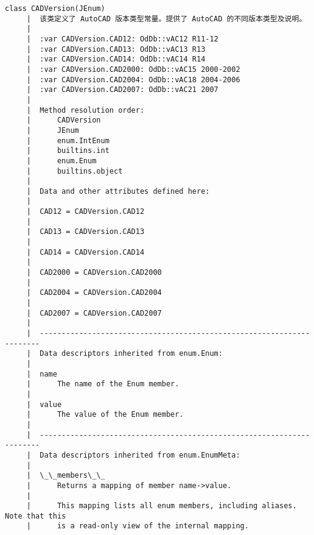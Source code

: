 \documentclass[11pt]{article}
\begin{document}
\begin{Verbatim}[commandchars=\\\{\}]
    class CADVersion(JEnum)
     |  该类定义了 AutoCAD 版本类型常量。提供了 AutoCAD 的不同版本类型及说明。
     |  
     |  :var CADVersion.CAD12: OdDb::vAC12 R11-12
     |  :var CADVersion.CAD13: OdDb::vAC13 R13
     |  :var CADVersion.CAD14: OdDb::vAC14 R14
     |  :var CADVersion.CAD2000: OdDb::vAC15 2000-2002
     |  :var CADVersion.CAD2004: OdDb::vAC18 2004-2006
     |  :var CADVersion.CAD2007: OdDb::vAC21 2007
     |  
     |  Method resolution order:
     |      CADVersion
     |      JEnum
     |      enum.IntEnum
     |      builtins.int
     |      enum.Enum
     |      builtins.object
     |  
     |  Data and other attributes defined here:
     |  
     |  CAD12 = CADVersion.CAD12
     |  
     |  CAD13 = CADVersion.CAD13
     |  
     |  CAD14 = CADVersion.CAD14
     |  
     |  CAD2000 = CADVersion.CAD2000
     |  
     |  CAD2004 = CADVersion.CAD2004
     |  
     |  CAD2007 = CADVersion.CAD2007
     |  
     |  ----------------------------------------------------------------------
     |  Data descriptors inherited from enum.Enum:
     |  
     |  name
     |      The name of the Enum member.
     |  
     |  value
     |      The value of the Enum member.
     |  
     |  ----------------------------------------------------------------------
     |  Data descriptors inherited from enum.EnumMeta:
     |  
     |  \_\_members\_\_
     |      Returns a mapping of member name->value.
     |      
     |      This mapping lists all enum members, including aliases. Note that this
     |      is a read-only view of the internal mapping.
    

\end{Verbatim}
\end{document}
